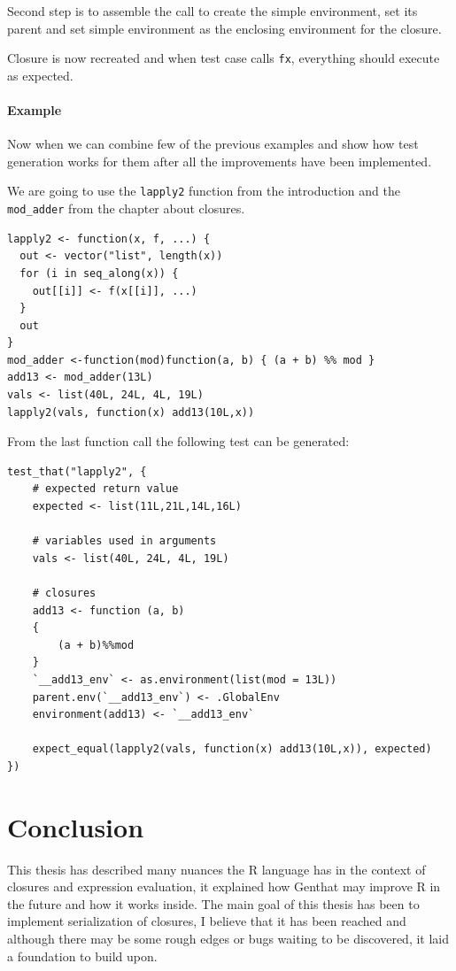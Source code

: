 \documentclass[thesis=B,english]{FITthesis}[2012/10/20]
\begin{document}
Second step is to assemble the call to create the simple environment, set its parent and set simple environment as the enclosing environment for the closure.

Closure is now recreated and when test case calls \verb|fx|, everything should execute as expected.

\subsubsection{Example}
Now when we can combine few of the previous examples and show how test generation works for them after all the improvements have been implemented. 

We are going to use the \verb|lapply2| function from the introduction and the \verb|mod_adder| from the chapter about closures.

\begin{verbatim}
lapply2 <- function(x, f, ...) {
  out <- vector("list", length(x))
  for (i in seq_along(x)) {
    out[[i]] <- f(x[[i]], ...)
  }
  out
}
mod_adder <-function(mod)function(a, b) { (a + b) %% mod }
add13 <- mod_adder(13L)
vals <- list(40L, 24L, 4L, 19L)  
lapply2(vals, function(x) add13(10L,x))
\end{verbatim}

From the last function call the following test can be generated:

\begin{verbatim}
test_that("lapply2", {                   
    # expected return value   
    expected <- list(11L,21L,14L,16L)        
    
    # variables used in arguments                     
    vals <- list(40L, 24L, 4L, 19L)
    
    # closures                     
    add13 <- function (a, b)
    {
        (a + b)%%mod
    }
    `__add13_env` <- as.environment(list(mod = 13L))
    parent.env(`__add13_env`) <- .GlobalEnv
    environment(add13) <- `__add13_env`
    
    expect_equal(lapply2(vals, function(x) add13(10L,x)), expected)
})                               
\end{verbatim}

\chapter{Conclusion}
This thesis has described many nuances the R language has in the context of closures and expression evaluation, it explained how Genthat may improve R in the future and how it works inside. The main goal of this thesis has been to implement serialization of closures, I believe that it has been reached and although there may be some rough edges or bugs waiting to be discovered, it laid a foundation to build upon. 
\end{document}
